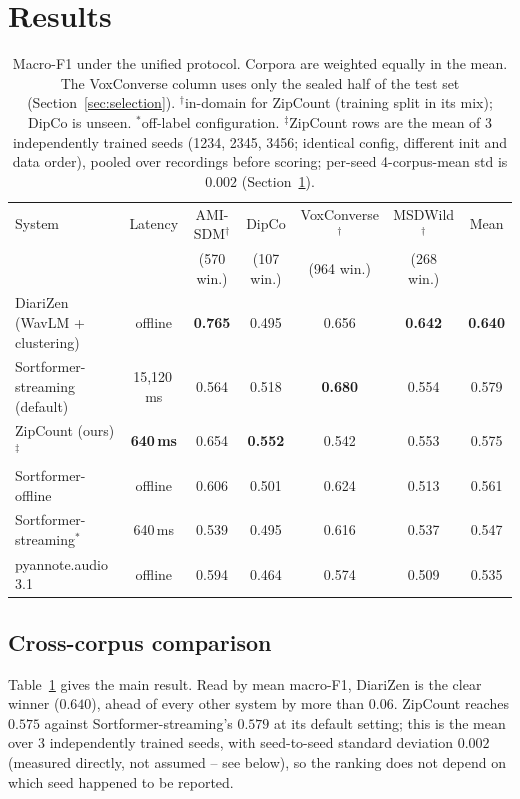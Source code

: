 \documentclass[journal]{IEEEtran}
\newcommand{\best}[1]{\textbf{#1}}
\newcommand{\sys}{ZipCount}
\begin{document}
\section{Results}
\label{sec:results}

\begin{table}[t]
\centering
\caption{Macro-F1 under the unified protocol. Corpora are weighted equally
in the mean. The VoxConverse column uses only the sealed half of the test
set (Section~\ref{sec:selection}). $^{\dagger}$in-domain for \sys{}
(training split in its mix); DipCo is unseen. $^{*}$off-label
configuration. $^{\ddagger}$\sys{} rows are the mean of 3 independently
trained seeds (1234, 2345, 3456; identical config, different init and
data order), pooled over recordings before scoring; per-seed 4-corpus-mean
std is $0.002$ (Section~\ref{sec:results}).}
\label{tab:main}
\begin{tabular}{lccccc c}
\toprule
System & Latency & AMI-SDM$^{\dagger}$ & DipCo & VoxConverse$^{\dagger}$ & MSDWild$^{\dagger}$ & Mean \\
       &         & (570 win.) & (107 win.) & (964 win.) & (268 win.) & \\
\midrule
DiariZen (WavLM + clustering)      & offline      & \best{0.765} & 0.495 & 0.656 & \best{0.642} & \best{0.640} \\
Sortformer-streaming (default)     & 15{,}120\,ms & 0.564 & 0.518 & \best{0.680} & 0.554 & 0.579 \\
\sys{} (ours)$^{\ddagger}$         & \best{640\,ms} & 0.654 & \best{0.552} & 0.542 & 0.553 & 0.575 \\
Sortformer-offline                 & offline      & 0.606 & 0.501 & 0.624 & 0.513 & 0.561 \\
Sortformer-streaming$^{*}$         & 640\,ms      & 0.539 & 0.495 & 0.616 & 0.537 & 0.547 \\
pyannote.audio 3.1                 & offline      & 0.594 & 0.464 & 0.574 & 0.509 & 0.535 \\
\bottomrule
\end{tabular}
\end{table}

\subsection{Cross-corpus comparison}
Table~\ref{tab:main} gives the main result. Read by mean macro-F1, DiariZen
is the clear winner ($0.640$), ahead of every other system by more than
$0.06$. \sys{} reaches $0.575$ against Sortformer-streaming's $0.579$ at its
default setting; this is the mean over 3 independently trained seeds, with
seed-to-seed standard deviation $0.002$ (measured directly, not assumed --
see below), so the ranking does not depend on which seed happened to be
reported.
\end{document}
